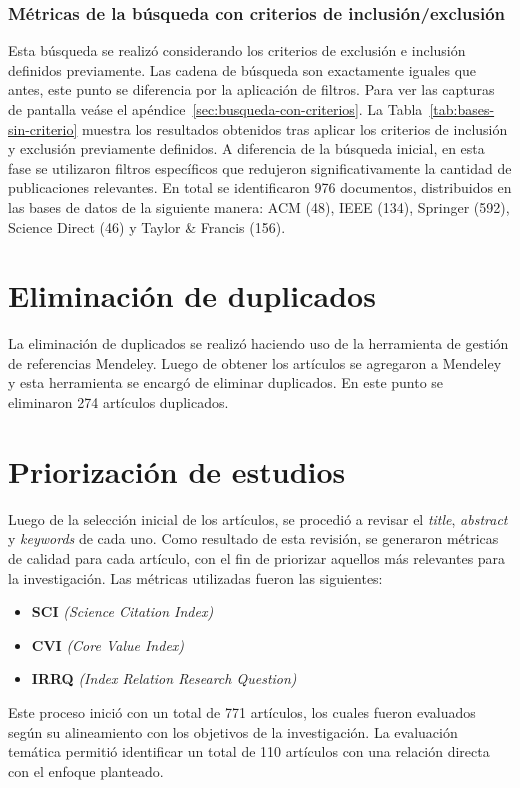 


\subsubsection{Métricas de la búsqueda con criterios de inclusión/exclusión}\label{subsec:resumenBusquedaCriterios}
\noindent
Esta búsqueda se realizó considerando los criterios de exclusión e inclusión definidos previamente. Las cadena de búsqueda son exactamente iguales que antes, este punto se diferencia por la aplicación de filtros. Para ver las capturas de pantalla veáse el apéndice~\ref{sec:busqueda-con-criterios}.
La Tabla~\ref{tab:bases-sin-criterio} muestra los resultados obtenidos tras aplicar los criterios de inclusión y exclusión previamente definidos. A diferencia de la búsqueda inicial, en esta fase se utilizaron filtros específicos que redujeron significativamente la cantidad de publicaciones relevantes. En total se identificaron 976 documentos, distribuidos en las bases de datos de la siguiente manera: ACM (48), IEEE (134), Springer (592), Science Direct (46) y Taylor \& Francis (156).




\section{Eliminación de duplicados}\label{sec:eliminacionDuplicados}
\noindent
La eliminación de duplicados se realizó haciendo uso de la herramienta de gestión de referencias Mendeley. Luego de obtener los artículos se agregaron a Mendeley y esta herramienta se encargó de eliminar duplicados. En este punto se eliminaron 274 artículos duplicados.

\section{Priorización de estudios}\label{sec:priorizacionEstudios}
\noindent
Luego de la selección inicial de los artículos, se procedió a revisar el \textit{title}, \textit{abstract} y \textit{keywords} de cada uno. Como resultado de esta revisión, se generaron métricas de calidad para cada artículo, con el fin de priorizar aquellos más relevantes para la investigación. Las métricas utilizadas fueron las siguientes:

\begin{itemize}
	\item \textbf{SCI} \textit{(Science Citation Index)}
	\item \textbf{CVI} \textit{(Core Value Index)}
	\item \textbf{IRRQ} \textit{(Index Relation Research Question)}
\end{itemize}
\noindent
Este proceso inició con un total de 771 artículos, los cuales fueron evaluados según su alineamiento con los objetivos de la investigación. La evaluación temática permitió identificar un total de 110 artículos con una relación directa con el enfoque planteado.

